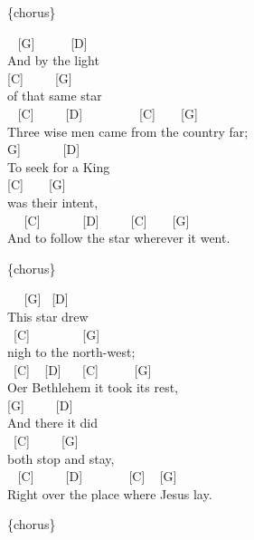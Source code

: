 \documentclass[
  letterpaper,
]{scrbook}
\begin{document}
\{chorus\}

~ {[}G{]} ~ ~ ~ {[}D{]}\\
And by the light\\
\hspace*{0.333em} {[}C{]} ~ ~ ~{[}G{]}\\
of that same star\\
\hspace*{0.333em} ~ {[}C{]} ~ ~ ~{[}D{]} ~ ~ ~ ~ ~ {[}C{]} ~ ~ {[}G{]}\\
Three wise men came from the country far;\\
\hspace*{0.333em}{[}G{]} ~ ~ ~ ~{[}D{]}\\
To seek for a King\\
\hspace*{0.333em} {[}C{]} ~ ~ {[}G{]}\\
was their intent,\\
\hspace*{0.333em} ~ ~{[}C{]} ~ ~ ~ ~{[}D{]} ~ ~ ~{[}C{]} ~ ~ {[}G{]}\\
And to follow the star wherever it went.

\{chorus\}

~ ~{[}G{]} ~{[}D{]}\\
This star drew\\
\hspace*{0.333em} ~{[}C{]} ~ ~ ~ ~ ~{[}G{]}\\
nigh to the north-west;\\
\hspace*{0.333em} ~{[}C{]} ~ {[}D{]} ~ ~{[}C{]} ~ ~ ~ {[}G{]}\\
O\textquotesingle er Bethlehem it took it\textquotesingle s rest,\\
\hspace*{0.333em} {[}G{]} ~ ~ ~{[}D{]}\\
And there it did\\
\hspace*{0.333em} ~{[}C{]} ~ ~ ~{[}G{]}\\
both stop and stay,\\
\hspace*{0.333em} ~ {[}C{]} ~ ~ ~{[}D{]} ~ ~ ~ ~ {[}C{]} ~ {[}G{]}\\
Right over the place where Jesus lay.

\{chorus\}
\end{document}
